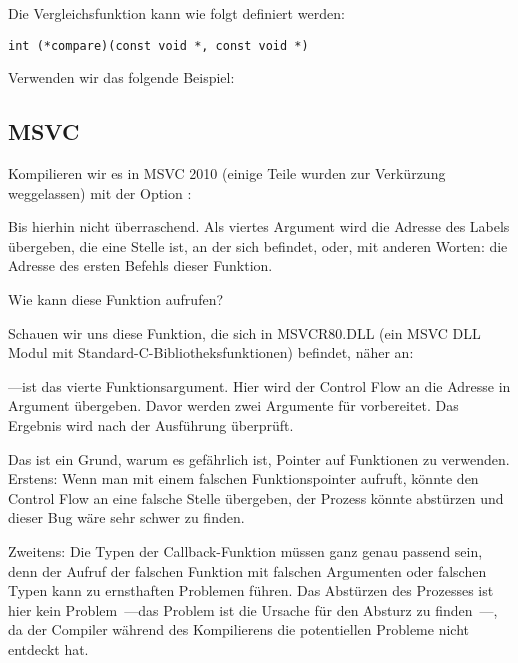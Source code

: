 Die Vergleichsfunktion kann wie folgt definiert werden:

\begin{lstlisting}
int (*compare)(const void *, const void *)
\end{lstlisting}

Verwenden wir das folgende Beispiel:



\subsection{MSVC}

Kompilieren wir es in MSVC 2010 (einige Teile wurden zur Verkürzung weggelassen) mit der Option \TT{\Ox}:


Bis hierhin nicht überraschend. 
Als viertes Argument wird die Adresse des Labels  übergeben, die eine Stelle ist, an der sich \comp befindet,
oder, mit anderen Worten: die Adresse des ersten Befehls dieser Funktion.

Wie kann \qsort diese Funktion aufrufen?

Schauen wir uns diese Funktion, die sich in MSVCR80.DLL (ein MSVC DLL Modul mit Standard-C-Bibliotheksfunktionen)
befindet, näher an:



---ist das vierte Funktionsargument.
Hier wird der Control Flow an die Adresse in  Argument übergeben.
Davor werden zwei Argumente für \comp vorbereitet. Das Ergebnis wird nach der Ausführung überprüft.

Das ist ein Grund, warum es gefährlich ist, Pointer auf Funktionen zu verwenden.
Erstens: Wenn man \qsort mit einem falschen Funktionspointer aufruft, könnte \qsort den Control Flow an eine falsche
Stelle übergeben, der Prozess könnte abstürzen und dieser Bug wäre sehr schwer zu finden.

Zweitens: Die Typen der Callback-Funktion müssen ganz genau passend sein, denn der Aufruf der falschen Funktion mit
falschen Argumenten oder falschen Typen kann zu ernsthaften Problemen führen. Das Abstürzen des Prozesses ist hier kein
Problem~---das Problem ist die Ursache für den Absturz zu finden~---, da der Compiler während des Kompilierens die
potentiellen Probleme nicht entdeckt hat.

